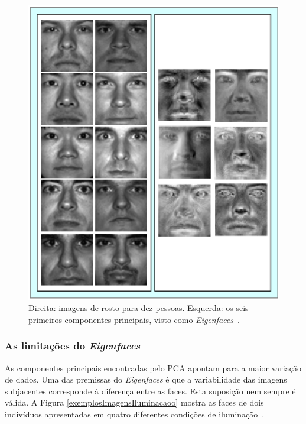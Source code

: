 	\begin{figure}[hbt]
		\begin{center}
			\includegraphics[width=13cm]{figuras/2.FundamentacaoTeorica/eigenfaces.png}
		\end{center}
		\caption{Direita: imagens de rosto para dez pessoas. Esquerda: os seis primeiros componentes principais, visto como \textit{Eigenfaces}~\cite{hewitt}.}
		\label{exemploEigenfaces}
	\end{figure}

\subsubsection{As limitações do \textit{Eigenfaces}}

As componentes principais encontradas pelo PCA apontam para a maior variação de dados. Uma das premissas do \textit{Eigenfaces} é que a variabilidade das imagens subjacentes corresponde à diferença entre as faces. Esta suposição nem sempre é válida. A Figura \ref{exemplosImagensIluminacaoo} mostra as faces de dois indivíduos apresentadas em quatro diferentes condições de iluminação~\cite{hewitt}.

